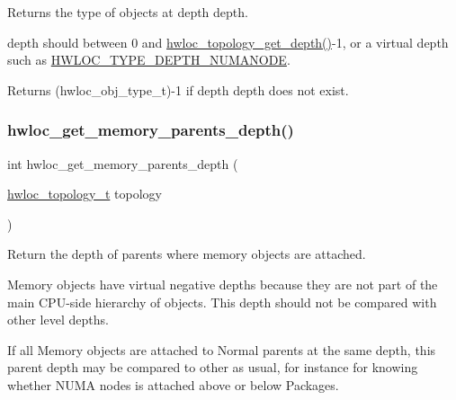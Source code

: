 Returns the type of objects at depth {\ttfamily depth}. 

{\ttfamily depth} should between 0 and \hyperlink{a00187_gae54d1782ca9b54bea915f5c18a9158fa}{hwloc\+\_\+topology\+\_\+get\+\_\+depth()}-\/1, or a virtual depth such as \hyperlink{a00187_ggaf4e663cf42bbe20756b849c6293ef575a245c34ec9884c2cf5de5049b2153ed9c}{H\+W\+L\+O\+C\+\_\+\+T\+Y\+P\+E\+\_\+\+D\+E\+P\+T\+H\+\_\+\+N\+U\+M\+A\+N\+O\+DE}.

\begin{DoxyReturn}{Returns}
(hwloc\+\_\+obj\+\_\+type\+\_\+t)-\/1 if depth {\ttfamily depth} does not exist. 
\end{DoxyReturn}
\mbox{\label{a00187_gae85786340b88e24835f8c403a1e2e54b}} 
\subsubsection{\texorpdfstring{hwloc\+\_\+get\+\_\+memory\+\_\+parents\+\_\+depth()}{hwloc\_get\_memory\_parents\_depth()}}
{\footnotesize\ttfamily int hwloc\+\_\+get\+\_\+memory\+\_\+parents\+\_\+depth (\begin{DoxyParamCaption}\item[{\hyperlink{a00186_ga9d1e76ee15a7dee158b786c30b6a6e38}{hwloc\+\_\+topology\+\_\+t}}]{topology }\end{DoxyParamCaption})}



Return the depth of parents where memory objects are attached. 

Memory objects have virtual negative depths because they are not part of the main C\+P\+U-\/side hierarchy of objects. This depth should not be compared with other level depths.

If all Memory objects are attached to Normal parents at the same depth, this parent depth may be compared to other as usual, for instance for knowing whether N\+U\+MA nodes is attached above or below Packages.


